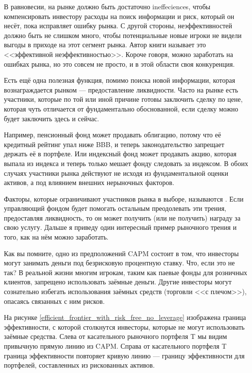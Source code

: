 В равновесии, на рынке должно быть достаточно 
{ineffeciences}, чтобы компенсировать инвестору расходы на поиск информации и 
риск, который он несёт, пока исправляет ошибку рынка. С другой стороны, 
неэффективностей должно быть не слишком много, чтобы потенциальные новые игроки 
не видели выгоды в приходе на этот сегмент рынка. Автор книги
\cite{pedersen2015efficiently} называет это <<эффективной неэффективностью>>. 
Короче говоря, можно заработать на ошибках рынка, но это совсем не просто, и в 
этой области своя конкуренция.

Есть ещё одна полезная функция, помимо поиска новой информации, которая 
вознаграждается рынком --- предоставление ликвидности. Часто на рынке есть 
участники, которые по той или иной причине готовы заключить сделку по цене, 
которая чуть отличается от фундаментально обоснованной, если сделку можно будет 
заключить здесь и сейчас.

Например, пенсионный фонд может продавать облигацию, потому что её кредитный 
рейтинг упал ниже BBB, и теперь законодательство запрещает держать её в 
портфеле. Или индексный фонд может продавать акцию, которая выпала из индекса и 
теперь только мешает фонду следовать за индексом. В обоих случаях участники 
рынка действуют не исходя из фундаментальной оценки активов, а под влиянием 
внешних нерыночных факторов.

Факторы, которые ограничивают участников рынка в выборе, называются 
. Если управляющий фондом будет 
помогать остальным преодолевать эти трения, предоставляя ликвидность, то он
может получить (или не получить) награду за свою услугу. Дальше я приведу 
один интересный пример рыночного трения и того, как на нём можно заработать.

Как вы помните, одно из предположений CAPM состоит в том, что инвесторы могут 
занимать деньги под безрисковую процентную ставку. Что, если это не так? В 
реальной жизни многим игрокам, таким как паевые фонды для розничных клиентов, 
запрещено использовать заёмные деньги. Другие инвесторы могут сознательно 
избегать использования заёмных средств (торговли <<с плечом>>), опасаясь 
связанных с ним рисков.

На рисунке \ref{efficient_frontier_with_risk_free_no_leverage} изображена 
граница эффективности, с которой столкнутся инвесторы, которые не могут 
использовать заёмные средства. Слева от касательного рыночного портфеля T мы
видим привычную прямую линию из CAPM. Справа от касательного портфеля T граница
эффективности повторяет кривую линию --- границу эффективности для портфелей, 
составленных из рискованных активов.


